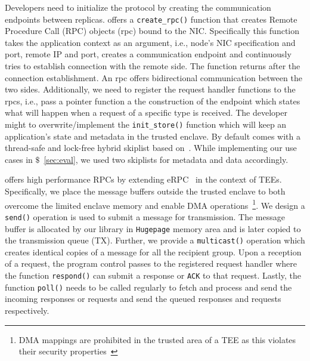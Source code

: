  Developers need to initialize the protocol by creating the communication endpoints between replicas. \projecttitle{} offers a \texttt{create\_rpc()} function that creates Remote Procedure Call (RPC) objects (rpc) bound to the NIC. Specifically this function takes the application context as an argument, i.e., node's NIC specification and port, remote IP and port, creates a communication endpoint and continuously tries to establish connection with the remote side. The function returns after the connection establishment. An rpc offers bidirectional communication between the two sides. Additionally, we need to register the request handler functions to the rpcs, i.e., pass a pointer function a the construction of the endpoint which states what will happen when a request of a specific type is received. The developer might to overwrite/implement the \texttt{init\_store()} function which will keep an application's state and metadata in the trusted enclave. By default \projecttitle{} comes with a thread-safe and lock-free hybrid skiplist based on~\cite{avocado, folly}. While implementing our use cases in $\$$~\ref{sec:eval}, we used two  \projecttitle{} skiplists for metadata and data accordingly.  %

 \projecttitle{} offers high performance RPCs by extending eRPC~\cite{erpc} in the context of TEEs. Specifically, we place the message buffers outside the trusted enclave to both overcome the limited enclave memory and enable DMA operations~\footnote{DMA mappings are prohibited in the trusted area of a TEE as this violates their security properties~\cite{intel-sgx}}. We design a \texttt{send()} operation is used to submit a message for transmission. The message buffer is allocated by our library in \texttt{Hugepage} memory area and is later copied to the transmission queue (TX). Further, we provide a \texttt{multicast()} operation which creates identical copies of a message for all the recipient group.    Upon a reception of a request, the program control passes to the registered request handler where the function \texttt{respond()} can submit a response or \texttt{ACK} to that request. Lastly, the function \texttt{poll()} needs to be called regularly to fetch and process and send the incoming responses or requests and send the queued responses and requests respectively. 

